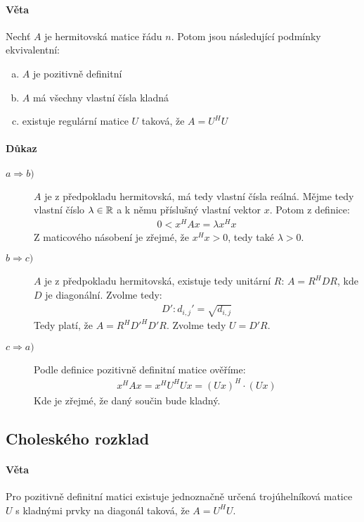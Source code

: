 \documentclass[a4paper,10pt]{article}
\begin{document}
\paragraph{Věta}
Nechť $A$ je hermitovská matice řádu $n$. Potom jsou následující podmínky
ekvivalentní:
\begin{enumerate}[a)]
	\item $A$ je pozitivně definitní
	\item $A$ má všechny vlastní čísla kladná
	\item existuje regulární matice $U$ taková, že $A = U^H U$
\end{enumerate}
\paragraph{Důkaz}
\begin{description}
	\item[$a \Rightarrow b)$] $A$ je z předpokladu hermitovská, má tedy vlastní
	čísla reálná. Mějme tedy vlastní číslo $\lambda \in \mathbb{R}$ a k němu příslušný
	vlastní vektor $x$. Potom z definice:
	\begin{align}
		0 < x^HAx = \lambda x^H x
	\end{align}
	Z maticového násobení je zřejmé, že $x^Hx > 0$, tedy také $\lambda > 0$.
	\item[$b \Rightarrow c)$] $A$ je z předpokladu hermitovská, existuje tedy
	unitární $R$: $A = R^H D R$, kde $D$ je diagonální. Zvolme tedy:
	\begin{align}
		D': d_{i,j}' = \sqrt{d_{i,j}}
	\end{align}
	Tedy platí, že $A =  R^{H} D'^H D' R$. Zvolme tedy $U=D'R$.
	\item[$c \Rightarrow a)$] Podle definice pozitivně definitní matice ověříme:
	\begin{align}
		x^H A x = x^H U^H U x = (Ux)^H \cdot (Ux)
	\end{align}
	Kde je zřejmé, že daný součin bude kladný.
\end{description}


\subsection{Choleského rozklad}
\setcounter{equation}{0}
\paragraph{Věta}
Pro pozitivně definitní matici existuje jednoznačně určená trojúhelníková matice
$U$ s kladnými prvky na diagonál taková, že $A = U^HU$.
\end{document}
